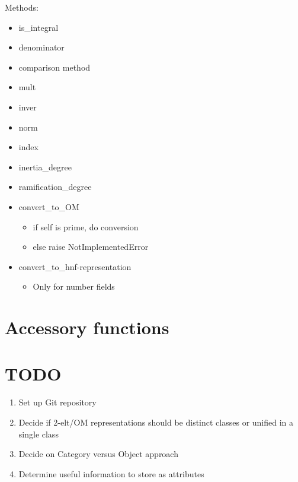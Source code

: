 \documentclass{amsart}
\theoremstyle{definition}
\begin{document}
	Methods:
	\begin{itemize}
		\item
		is\_integral
		\item
		denominator
		\item
		comparison method
		\item
		mult
		\item
		inver
		\item
		norm
		\item
		index
		\item
		inertia\_degree
		\item
		ramification\_degree
		\item
		convert\_to\_OM
		\begin{itemize}
			\item 
			if self is prime, do conversion
			\item
			else raise NotImplementedError
		\end{itemize}
		\item
		convert\_to\_hnf-representation
		\begin{itemize}
			\item 
			Only for number fields
		\end{itemize}
	\end{itemize}

\section{Accessory functions}

\section{TODO}

\begin{enumerate}
	\item
		Set up Git repository
	\item
		Decide if 2-elt/OM representations should be distinct classes or unified in a single class
	\item
		Decide on Category versus Object approach
	\item
		Determine useful information to store as attributes
\end{enumerate}
\end{document}
